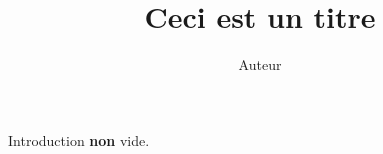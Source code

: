 \documentclass[big]{zmdocument}
\title{Ceci est un titre}
\author{Auteur}
\begin{document}
\tableofcontents
\newpage

\begin{LevelOneIntroduction}
   Introduction \textbf{non} vide.
\end{LevelOneIntroduction}


\end{document}
